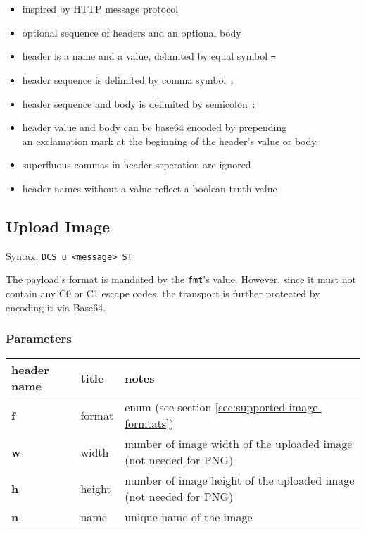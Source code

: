 \documentclass[a4paper]{article}
\newcommand{\code}[1]{\colorbox{light-gray}{\texttt{#1}}}
\begin{document}
\begin{itemize}
    \item inspired by HTTP message protocol
    \item optional sequence of headers and an optional body
    \item header is a name and a value, delimited by equal symbol \code{=}
    \item header sequence is delimited by comma symbol \code{,}
    \item header sequence and body is delimited by semicolon \code{;}
    \item header value and body can be base64 encoded by prepending \\
        an exclamation mark at the beginning of the header's value or body.
    \item superfluous commas in header seperation are ignored
    \item header names without a value reflect a boolean truth value
\end{itemize}

\subsection{Upload Image}

Syntax: \code{DCS u <message> ST}

The payload's format is mandated by the \code{fmt}'s value. However, since it must not contain
any C0 or C1 escape codes, the transport is further protected by encoding it via Base64.

\subsubsection*{Parameters}

\begin{tabular}{ |l|l|l| }
    \hline
    \textbf{header name}   & \textbf{title}   & \textbf{notes} \\
    \hline
    \textbf{f}       & format & enum (see section \ref{sec:supported-image-formtats}) \\
    \textbf{w}       & width & number of image width of the uploaded image (not needed for PNG) \\
    \textbf{h}       & height & number of image height of the uploaded image (not needed for PNG) \\
    \textbf{n}       & name & unique name of the image \\
    \hline
\end{tabular}
\end{document}
